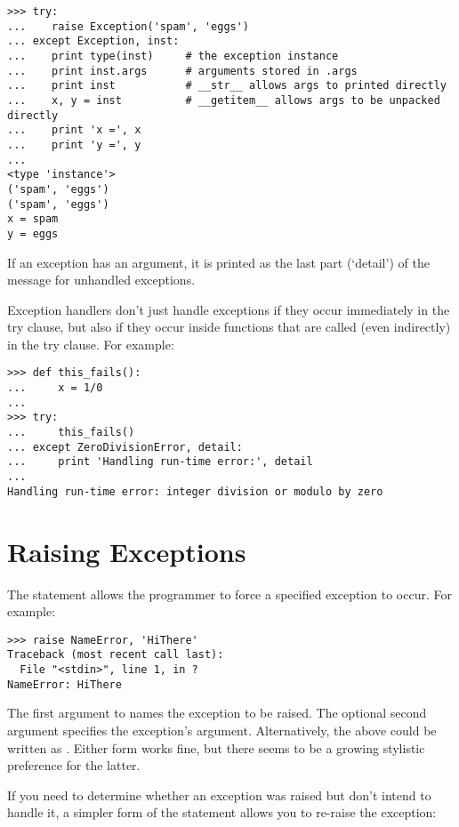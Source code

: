 \documentclass{manual}
\begin{document}
\begin{verbatim}
>>> try:
...    raise Exception('spam', 'eggs')
... except Exception, inst:
...    print type(inst)     # the exception instance
...    print inst.args      # arguments stored in .args
...    print inst           # __str__ allows args to printed directly
...    x, y = inst          # __getitem__ allows args to be unpacked directly
...    print 'x =', x
...    print 'y =', y
...
<type 'instance'>
('spam', 'eggs')
('spam', 'eggs')
x = spam
y = eggs
\end{verbatim}

If an exception has an argument, it is printed as the last part
(`detail') of the message for unhandled exceptions.

Exception handlers don't just handle exceptions if they occur
immediately in the try clause, but also if they occur inside functions
that are called (even indirectly) in the try clause.
For example:

\begin{verbatim}
>>> def this_fails():
...     x = 1/0
... 
>>> try:
...     this_fails()
... except ZeroDivisionError, detail:
...     print 'Handling run-time error:', detail
... 
Handling run-time error: integer division or modulo by zero
\end{verbatim}


\section{Raising Exceptions \label{raising}}

The  statement allows the programmer to force a
specified exception to occur.
For example:

\begin{verbatim}
>>> raise NameError, 'HiThere'
Traceback (most recent call last):
  File "<stdin>", line 1, in ?
NameError: HiThere
\end{verbatim}

The first argument to  names the exception to be
raised.  The optional second argument specifies the exception's
argument.  Alternatively, the above could be written as
.  Either form works fine, but there
seems to be a growing stylistic preference for the latter.

If you need to determine whether an exception was raised but don't
intend to handle it, a simpler form of the  statement
allows you to re-raise the exception:
\end{document}
